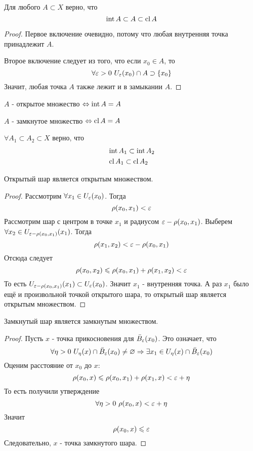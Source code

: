 \begin{lemma}
	Для любого $A \subset X$ верно, что
	\[
		\operatorname{int} A \subset A \subset \operatorname{cl} A
	\]
\end{lemma}

\begin{proof}
	Первое включение очевидно, потому что любая внутренняя точка принадлежит $A$.
	
	Второе включение следует из того, что если $x_0 \in A$, то
	\[
		\forall \varepsilon > 0\ U_\varepsilon(x_0) \cap A \supset \{x_0\}
	\]
	Значит, любая точка $A$ также лежит и в замыкании $A$.
\end{proof}

\begin{corollary}
	$A$ - открытое множество $\Leftrightarrow \operatorname{int} A = A$
	
	$A$ - замкнутое множество $\Leftrightarrow \operatorname{cl} A = A$ 
\end{corollary}

\begin{lemma} \label{includeLemma}
	$\forall A_1 \subset A_2 \subset X$ верно, что
	\begin{align*}
		&\operatorname{int} A_1 \subset \operatorname{int} A_2
		\\
		&\operatorname{cl} A_1 \subset \operatorname{cl} A_2
	\end{align*}
\end{lemma}

\begin{lemma}
	Открытый шар является открытым множеством.
\end{lemma}

\begin{proof}
	Рассмотрим $\forall x_1 \in U_\varepsilon(x_0)$. Тогда
	\[
		\rho(x_0, x_1) < \varepsilon
	\]
	Рассмотрим шар с центром в точке $x_1$ и радиусом $\varepsilon - \rho(x_0, x_1)$. Выберем $\forall x_2 \in U_{\varepsilon - \rho(x_0, x_1)}(x_1)$. Тогда
	\[
		\rho(x_1, x_2) < \varepsilon - \rho(x_0, x_1)
	\]
	Отсюда следует
	\[
		\rho(x_0, x_2) \leqslant \rho(x_0, x_1) + \rho(x_1, x_2) < \varepsilon
	\]
	То есть $U_{\varepsilon - \rho(x_0, x_1)}(x_1) \subset U_\varepsilon(x_0)$. Значит $x_1$ - внутренняя точка. А раз $x_1$ было ещё и произвольной точкой открытого шара, то открытый шар является открытым множеством.
\end{proof}

\begin{lemma}
	Замкнутый шар является замкнутым множеством.
\end{lemma}

\begin{proof}
	Пусть $x$ - точка прикосновения для $\bar{B}_\varepsilon(x_0)$. Это означает, что
	\[
		\forall \eta > 0\ U_\eta(x) \cap \bar{B}_\varepsilon(x_0) \neq \varnothing \Rightarrow \exists x_1 \in U_\eta(x) \cap \bar{B}_\varepsilon(x_0)
	\]
	Оценим расстояние от $x_0$ до $x$:
	\[
		\rho(x_0, x) \leqslant \rho(x_0, x_1) + \rho(x_1, x) < \varepsilon + \eta
	\]
	То есть получили утверждение
	\[
		\forall \eta > 0\ \rho(x_0, x) < \varepsilon + \eta
	\]
	Значит
	\[
		\rho(x_0, x) \leqslant \varepsilon
	\]
	Следовательно, $x$ - точка замкнутого шара.
\end{proof}

